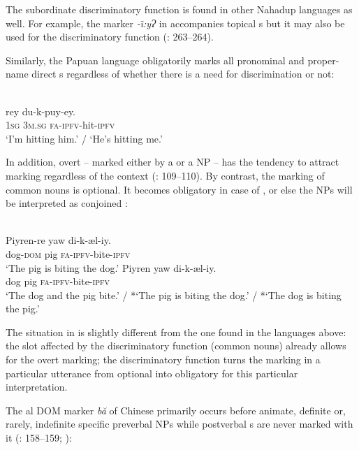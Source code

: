 \documentclass[output=paper]{langsci/langscibook}
\begin{document}
The subordinate discriminatory function is found in other Nahadup languages as well. For example, the  marker \textit{{}-\~\i:yɁ} in  accompanies topical s but it may also be used for the discriminatory function (\citealt{MartinsMartins1999}: 263–264). 

Similarly, the Papuan language  obligatorily marks all pronominal and proper-name direct s regardless of whether there is a need for discrimination or not:

\ea\label{ex:serzant:18}
\\
\gll *   rey   du-k-puy-ey.\\
     \textsc{1sg}   \textsc{3m.sg}  \textsc{fa-ipfv}{}-hit-\textsc{ipfv}\\
 ‘I’m hitting him.’ / ‘He’s hitting me.’
\z

In addition, overt  – marked either by a  or a  NP – has the tendency to attract  marking regardless of the context (\citealt{Feldman1986}: 109\-–110). By contrast, the marking of common nouns is optional. It becomes obligatory in case of , or else the NPs will be interpreted as conjoined \citep[110]{Feldman1986}:

\ea\label{ex:serzant:19}
\\
\ea
\gll Piyren-re  yaw  di-k-æl-iy.\\
     dog-\textsc{dom}  pig  \textsc{fa-ipfv}{}-bite-\textsc{ipfv}\\
\glt ‘The pig is biting the dog.’
\ex
\gll Piyren  yaw  di-k-æl-iy.\\
     dog  pig  \textsc{fa-ipfv}{}-bite-\textsc{ipfv}\\
\glt ‘The dog and the pig bite.’ / *‘The pig is biting the dog.’ / *‘The dog is biting the pig.’
\z
\z

The situation in  is slightly different from the one found in the languages above: the slot affected by the discriminatory function (common nouns) already allows for the overt marking; the discriminatory function turns the marking in a particular utterance from optional into obligatory for this particular interpretation.

The al DOM marker \textit{bă} of Chinese primarily occurs before animate, definite or, rarely, indefinite specific preverbal  NPs while postverbal s are never marked with it (\citealt{LiThompson1981,Bisang1992}: 158–159; \citealt{YangvanBergen2007}):
\end{document}
